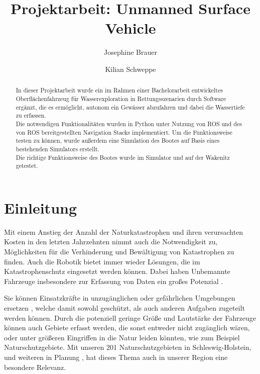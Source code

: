 \documentclass[11pt]{article}
\begin{document}
\title{Projektarbeit: Unmanned Surface Vehicle}

\author{Josephine Brauer \and Kilian Schweppe}

\maketitle

\begin{abstract}
In dieser Projektarbeit wurde ein im Rahmen einer Bachelorarbeit entwickeltes Oberflächenfahrzeug für Wasserexploration in Rettungsszenarien durch Software ergänzt, die es ermöglicht, autonom ein Gewässer abzufahren und dabei die Wassertiefe zu erfassen.\\
Die notwendigen Funktionalitäten wurden in Python unter Nutzung von ROS und des von ROS bereitgestellten Navigation Stacks implementiert. Um die Funktionsweise testen zu können, wurde außerdem eine Simulation des Bootes auf Basis eines bestehenden Simulators erstellt.\\
Die richtige Funktionsweise des Bootes wurde im Simulator und auf der Wakenitz getestet.
\end{abstract}

\section{Einleitung}
Mit einem Anstieg der Anzahl der Naturkatastrophen und ihren verursachten Kosten in den letzten Jahrzehnten\cite{kellenberg} nimmt auch die Notwendigkeit zu, Möglichkeiten für die Verhinderung und Bewältigung von Katastrophen zu finden. Auch die Robotik bietet immer wieder Lösungen, die im Katastrophenschutz eingesetzt werden können. Dabei haben Unbemannte Fahrzeuge insbesondere zur Erfassung von Daten ein großes Potenzial \cite{surveyDisasterRobotics}.

Sie können Einsatzkräfte in unzugänglichen oder gefährlichen Umgebungen ersetzen \cite{bellingham}, welche damit sowohl geschützt, als auch anderen Aufgaben zugeteilt werden können. Durch die potenziell geringe Größe und Lautstärke der Fahrzeuge können auch Gebiete erfasst werden, die sonst entweder nicht zugänglich wären, oder unter größeren Eingriffen in die Natur leiden könnten, wie zum Beispiel Naturschutzgebiete. Mit unseren 201 Naturschutzgebieten in Schleswig-Holstein, und weiteren in Planung \cite{Naturschutz}, hat dieses Thema auch in unserer Region eine besondere Relevanz.
\end{document}
